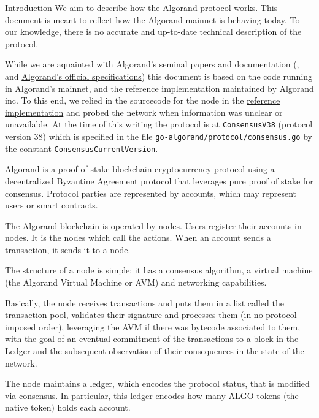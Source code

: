 \documentclass[10pt,a4paper]{article}
\begin{document}
\begin{section}{Introduction}
We aim to describe how the Algorand protocol works. 
This document is meant to reflect how the Algorand mainnet is behaving
today. 
To our knowledge, there is no accurate and up-to-date technical description 
of the protocol. 

While we are aquainted with Algorand's seminal papers and documentation 
(\cite{DBLP:conf/sosp/GiladHMVZ17}, \cite{DBLP:journals/corr/Micali16} and
\href{https://github.com/algorandfoundation/specs}{Algorand's official specifications})
this document is based on the code running in Algorand's mainnet, and the reference
implementation maintained by Algorand inc. To this end, we relied in the sourcecode
for the node in the \href{https://github.com/algorand/go-algorand/}{reference implementation}
and probed the network when information was unclear or unavailable.
At the time of this writing the protocol is at {\tt ConsensusV38} 
(protocol version 38)
which is specified in the file {\tt go-algorand/protocol/consensus.go} by the
constant {\tt ConsensusCurrentVersion}. 

Algorand is a proof-of-stake blockchain cryptocurrency protocol 
using a decentralized By\-zan\-tine Agreement protocol that leverages 
pure proof of stake for consensus. 
Protocol parties are represented by accounts, which may represent users
or smart contracts. 

The Algorand blockchain is operated by nodes. Users register their accounts 
in nodes. It is the nodes which call the actions. 
When an account sends a transaction, it sends it to a node. 

The structure of a node is simple: 
it has a consensus algorithm,
a virtual machine (the Algorand Virtual Machine or AVM) and networking
capabilities.

Basically, the node receives transactions and puts them in a list called 
the {\sf transaction pool},
validates their signature and processes them (in no protocol-imposed order), leveraging the
AVM if there was bytecode associated to them, with the goal of an eventual commitment of the transactions
to a block in the Ledger and the subsequent observation of their consequences in the state of the network.

The node maintains a ledger, which encodes the protocol status,
that is modified via consensus.
In particular, this ledger encodes how many {\sf ALGO tokens} 
(the native token) holds each account.


\end{section}
\end{document}
